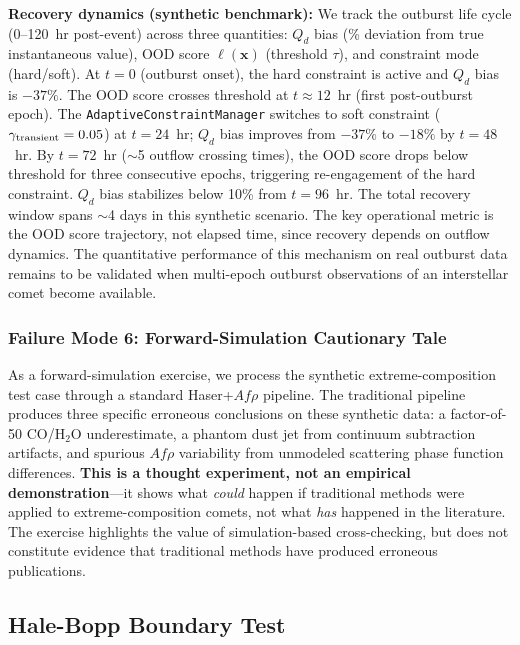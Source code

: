 \documentclass[usenatbib]{mnras}
\begin{document}
\textbf{Recovery dynamics (synthetic benchmark):} We track the outburst life cycle (0--120~hr post-event) across three quantities: $Q_d$ bias (\% deviation from true instantaneous value), OOD score $\ell(\mathbf{x})$ (threshold $\tau$), and constraint mode (hard/soft). At $t=0$ (outburst onset), the hard constraint is active and $Q_d$ bias is $-37\%$. The OOD score crosses threshold at $t \approx 12$~hr (first post-outburst epoch). The \texttt{AdaptiveConstraintManager} switches to soft constraint ($\gamma_{\rm transient}=0.05$) at $t=24$~hr; $Q_d$ bias improves from $-37\%$ to $-18\%$ by $t=48$~hr. By $t=72$~hr ($\sim$5 outflow crossing times), the OOD score drops below threshold for three consecutive epochs, triggering re-engagement of the hard constraint. $Q_d$ bias stabilizes below 10\% from $t=96$~hr. The total recovery window spans $\sim$4 days in this synthetic scenario. The key operational metric is the OOD score trajectory, not elapsed time, since recovery depends on outflow dynamics. The quantitative performance of this mechanism on real outburst data remains to be validated when multi-epoch outburst observations of an interstellar comet become available.

\subsubsection{Failure Mode 6: Forward-Simulation Cautionary Tale}

As a forward-simulation exercise, we process the synthetic extreme-composition test case through a standard Haser+$Af\rho$ pipeline. The traditional pipeline produces three specific erroneous conclusions on these synthetic data: a factor-of-50 CO/H$_2$O underestimate, a phantom dust jet from continuum subtraction artifacts, and spurious $Af\rho$ variability from unmodeled scattering phase function differences. \textbf{This is a thought experiment, not an empirical demonstration}---it shows what \textit{could} happen if traditional methods were applied to extreme-composition comets, not what \textit{has} happened in the literature. The exercise highlights the value of simulation-based cross-checking, but does not constitute evidence that traditional methods have produced erroneous publications.

\subsection{Hale-Bopp Boundary Test}\label{sec:proxy}
\end{document}
